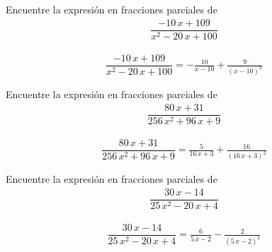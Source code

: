 
{}
\begin{problema}
	Encuentre la expresión en fracciones parciales de
	\begin{align*}
		\dfrac{-10 \, x + 109}{x^{2} - 20 \, x + 100}
	\end{align*}
\end{problema}

\begin{align*}
	\dfrac{-10 \, x + 109}{x^{2} - 20 \, x + 100}= -\frac{10}{x - 10} + \frac{9}{{\left(x - 10\right)}^{2}}
\end{align*}


{}
\begin{problema}
	Encuentre la expresión en fracciones parciales de
	\begin{align*}
		\dfrac{80 \, x + 31}{256 \, x^{2} + 96 \, x + 9}
	\end{align*}
\end{problema}

\begin{align*}
	\dfrac{80 \, x + 31}{256 \, x^{2} + 96 \, x + 9}= \frac{5}{16 \, x + 3} + \frac{16}{{\left(16 \, x + 3\right)}^{2}}
\end{align*}


{}
\begin{problema}
	Encuentre la expresión en fracciones parciales de
	\begin{align*}
		\dfrac{30 \, x - 14}{25 \, x^{2} - 20 \, x + 4}
	\end{align*}
\end{problema}

\begin{align*}
	\dfrac{30 \, x - 14}{25 \, x^{2} - 20 \, x + 4}= \frac{6}{5 \, x - 2} - \frac{2}{{\left(5 \, x - 2\right)}^{2}}
\end{align*}


